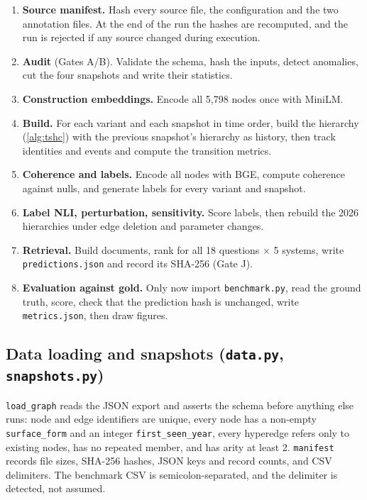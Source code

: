 \documentclass[11pt,a4paper]{article}
\newcommand{\cref}[1]{\autoref{#1}}
\theoremstyle{remark}
\newcommand{\code}[1]{\texttt{\small #1}}
\begin{document}
\begin{enumerate}
  \item \textbf{Source manifest.} Hash every source file, the configuration and the two
        annotation files. At the end of the run the hashes are recomputed, and the run is
        rejected if any source changed during execution.
  \item \textbf{Audit} (Gates A/B). Validate the schema, hash the inputs, detect
        anomalies, cut the four snapshots and write their statistics.
  \item \textbf{Construction embeddings.} Encode all 5{,}798 nodes once with MiniLM.
  \item \textbf{Build.} For each variant and each snapshot in time order, build the
        hierarchy (\cref{alg:tshc}) with the previous snapshot's hierarchy as history, then
        track identities and events and compute the transition metrics.
  \item \textbf{Coherence and labels.} Encode all nodes with BGE, compute coherence
        against nulls, and generate labels for every variant and snapshot.
  \item \textbf{Label NLI, perturbation, sensitivity.} Score labels, then rebuild the
        2026 hierarchies under edge deletion and parameter changes.
  \item \textbf{Retrieval.} Build documents, rank for all 18 questions $\times$ 5
        systems, write \code{predictions.json} and record its SHA-256 (Gate J).
  \item \textbf{Evaluation against gold.} Only now import \code{benchmark.py}, read the
        ground truth, score, check that the prediction hash is unchanged, write
        \code{metrics.json}, then draw figures.
\end{enumerate}

\subsection{Data loading and snapshots (\code{data.py}, \code{snapshots.py})}

\code{load\_graph} reads the JSON export and asserts the schema before anything else runs:
node and edge identifiers are unique, every node has a non-empty \code{surface\_form} and an
integer \code{first\_seen\_year}, every hyperedge refers only to existing nodes, has no
repeated member, and has arity at least 2. \code{manifest} records file sizes, SHA-256
hashes, JSON keys and record counts, and CSV delimiters. The benchmark CSV is
semicolon-separated, and the delimiter is detected, not assumed.
\end{document}
